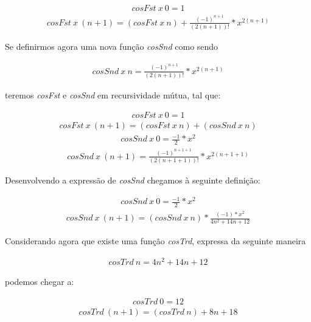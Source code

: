 \documentclass[a4paper]{article}
\begin{document}
\begin{eqnarray*}
cosFst\ x\ 0 = 1
\end{eqnarray*}
\begin{eqnarray*}
cosFst\ x\ (n+1) = (cosFst\ x\ n) + \frac{(-1)^{n+1}}{(2(n+1))!}*x^{2(n+1)}
\end{eqnarray*}

Se definirmos agora uma nova função \textit{cosSnd} como sendo

\begin{eqnarray*}
cosSnd\ x\ n = \frac{(-1)^{n+1}}{(2(n+1))!}*x^{2(n+1)}
\end{eqnarray*}

teremos \textit{cosFst} e \textit{cosSnd} em recursividade mútua, tal que:

\begin{eqnarray*}
cosFst\ x\ 0 = 1
\end{eqnarray*}
\begin{eqnarray*}
cosFst\ x\ (n+1) = (cosFst\ x\ n) + (cosSnd\ x\ n)
\end{eqnarray*}
\begin{eqnarray*}
cosSnd\ x\ 0 = \frac{-1}{2}*x^{2}
\end{eqnarray*}
\begin{eqnarray*}
cosSnd\ x\ (n+1) = \frac{(-1)^{n+1+1}}{(2(n+1+1))!}*x^{2(n+1+1)}
\end{eqnarray*}

Desenvolvendo a expressão de \textit{cosSnd} chegamos à seguinte definição:

\begin{eqnarray*}
cosSnd\ x\ 0 = \frac{-1}{2}*x^{2}
\end{eqnarray*}
\begin{eqnarray*}
cosSnd\ x\ (n+1) = (cosSnd\ x\ n)*\frac{(-1)*x^{2}}{4n^{2}+14n+12}
\end{eqnarray*}

Considerando agora que existe uma função \textit{cosTrd}, expressa da seguinte maneira

\begin{eqnarray*}
cosTrd\ n = 4n^{2}+14n+12
\end{eqnarray*}

podemos chegar a:

\begin{eqnarray*}
cosTrd\ 0 = 12
\end{eqnarray*}
\begin{eqnarray*}
cosTrd\ (n+1) = (cosTrd\ n)+8n+18
\end{eqnarray*}
\end{document}
